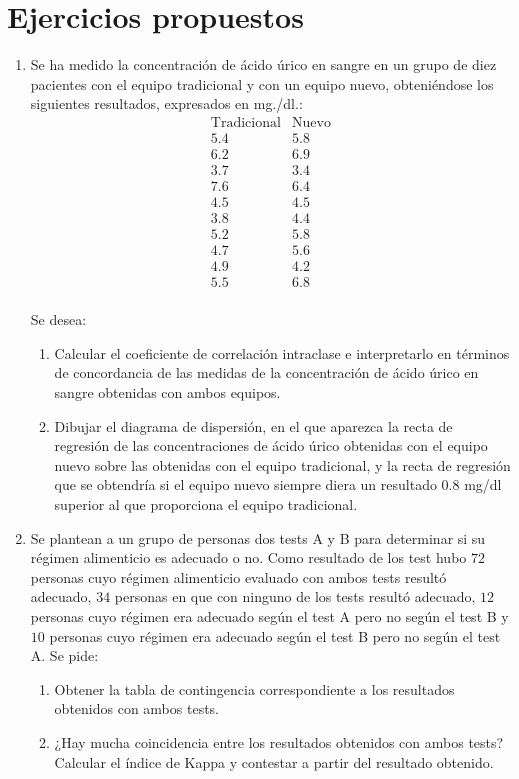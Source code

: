 \section{Ejercicios propuestos}
\begin{enumerate}[leftmargin=*]
\item Se ha medido la concentración de ácido úrico en sangre en un grupo de diez pacientes con el equipo tradicional y con un  equipo nuevo,
obteniéndose los siguientes resultados, expresados en mg./dl.:
\[
\begin{array}{cc}
\hline
\text{Tradicional} & \text{Nuevo}\\
\hline
5.4 & 5.8 \\
6.2 & 6.9 \\
3.7 & 3.4 \\
7.6 & 6.4 \\
4.5 & 4.5 \\
3.8 & 4.4 \\
5.2 & 5.8 \\
4.7 & 5.6 \\
4.9 & 4.2 \\
5.5 & 6.8 \\
\end{array}
\]

Se desea:
\begin{enumerate}
\item Calcular el coeficiente de correlación intraclase e interpretarlo en términos de concordancia de las medidas de la concentración de ácido úrico en sangre obtenidas con ambos equipos.
\item Dibujar el diagrama de dispersión, en el que aparezca la recta de regresión de las concentraciones de ácido úrico obtenidas con el
equipo nuevo sobre las obtenidas con el equipo tradicional, y la recta de regresión que se obtendría si el equipo nuevo siempre diera un
resultado $0.8$ mg/dl superior al que proporciona el equipo tradicional.
\end{enumerate}

\item Se plantean a un grupo de personas dos tests A y B para determinar si su régimen alimenticio es adecuado o no. Como resultado de los
test hubo $72$ personas cuyo régimen alimenticio evaluado con ambos tests resultó adecuado, $34$ personas en que con ninguno de los tests
resultó adecuado, $12$ personas cuyo régimen era adecuado según el test A pero no según el test B y $10$ personas cuyo régimen era adecuado
según el test B pero no según el test A. Se pide:
\begin{enumerate}
\item Obtener la tabla de contingencia correspondiente a los resultados obtenidos con ambos tests.
\item ¿Hay mucha coincidencia entre los resultados obtenidos con ambos tests? Calcular el índice de Kappa y contestar a partir del resultado obtenido.
\end{enumerate}
\end{enumerate}